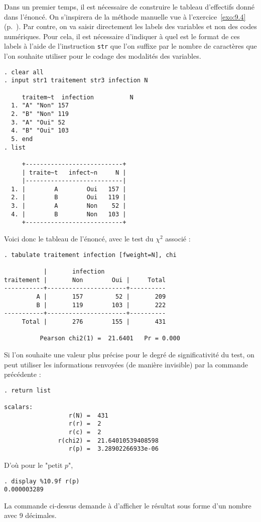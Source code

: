\soln{\ref{exo:10.4}}
Dans un premier temps, il est nécessaire de construire le tableau
d'effectifs donné dans l'énoncé. On s'inspirera de la méthode manuelle vue à
l'exercice~\ref{exo:9.4} (p.~\pageref{exo:9.4}). Par contre, on va
saisir directement les labels des variables et non des codes
numériques. Pour cela, il est nécessaire d'indiquer à \Stata quel est le
format de ces labels à l'aide de l'instruction \texttt{str} que l'on suffixe
par le nombre de caractères que l'on souhaite utiliser pour le codage des
modalités des variables.
\begin{verbatim}
. clear all
. input str1 traitement str3 infection N

     traitem~t  infection          N
  1. "A" "Non" 157
  2. "B" "Non" 119
  3. "A" "Oui" 52
  4. "B" "Oui" 103
  5. end
. list

     +---------------------------+
     | traite~t   infect~n     N |
     |---------------------------|
  1. |        A        Oui   157 |
  2. |        B        Oui   119 |
  3. |        A        Non    52 |
  4. |        B        Non   103 |
     +---------------------------+
\end{verbatim}


Voici donc le tableau de l'énoncé, avec le test du $\chi^2$ associé :
\begin{verbatim}
. tabulate traitement infection [fweight=N], chi

           |       infection
traitement |       Non        Oui |     Total
-----------+----------------------+----------
         A |       157         52 |       209 
         B |       119        103 |       222 
-----------+----------------------+----------
     Total |       276        155 |       431 

          Pearson chi2(1) =  21.6401   Pr = 0.000
\end{verbatim}
Si l'on souhaite une valeur plus précise pour le degré de significativité du
test, on peut utiliser les informations renvoyées (de manière invisible) par
la commande précédente :
\begin{verbatim}
. return list

scalars:
                  r(N) =  431
                  r(r) =  2
                  r(c) =  2
               r(chi2) =  21.64010539408598
                  r(p) =  3.28902266933e-06
\end{verbatim}
D'où pour le "petit $p$", 
\begin{verbatim}
. display %10.9f r(p)
0.000003289
\end{verbatim}
La commande ci-dessus demande à \Stata d'afficher le résultat sous forme d'un
nombre avec 9 décimales.

